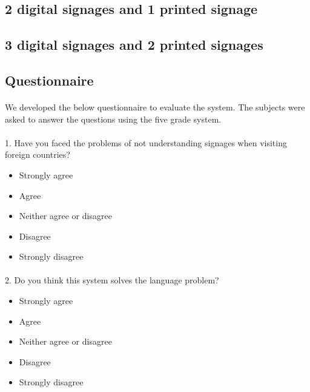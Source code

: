 \documentclass[12pt]{article}
\begin{document}
\subsection{2 digital signages and 1 printed signage }
\label{twoone}
\paragraph{}

\subsection{3 digital signages and 2 printed signages }
\label{threetwo}
\paragraph{}

\subsection{Questionnaire}

\paragraph{}We developed the below questionnaire to evaluate the system. The subjects were asked to answer the questions using the five grade system. 

\paragraph{}1. Have you faced the problems of not understanding signages when visiting foreign countries?
\begin{itemize}
	\item Strongly agree
	\item Agree
	\item Neither agree or disagree
	\item Disagree
	\item Strongly disagree
\end{itemize}

\paragraph{}

\paragraph{}2. Do you think this system solves the language problem?
\begin{itemize}
	\item Strongly agree
	\item Agree
	\item Neither agree or disagree
	\item Disagree
	\item Strongly disagree
\end{itemize}
\end{document}

